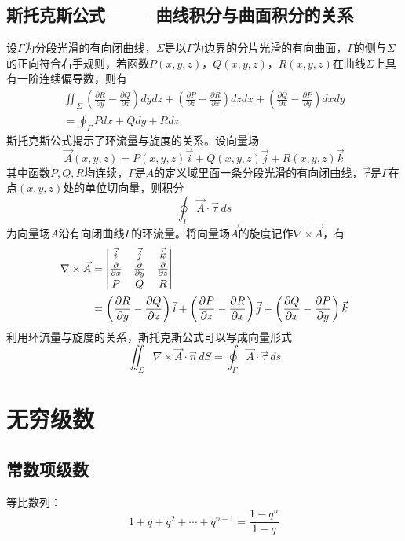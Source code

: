 \documentclass[a4paper,zihao=-4,UTF8]{ctexbook}
\begin{document}
\subsection{斯托克斯公式 —— 曲线积分与曲面积分的关系}
设$\Gamma$为分段光滑的有向闭曲线，$\Sigma$是以$\Gamma$为边界的分片光滑的有向曲面，$\Gamma$的侧与$\Sigma$的正向符合右手规则，若函数$P(x,y,z)$，$Q(x,y,z)$，$R(x,y,z)$在曲线$\Sigma$上具有一阶连续偏导数，则有
\begin{multline*}
\iint_\Sigma\left(\frac{\partial R}{\partial y}-\frac{\partial Q}{\partial z}\right)dydz+
\left(\frac{\partial P}{\partial z}-\frac{\partial R}{\partial x}\right)dzdx+
\left(\frac{\partial Q}{\partial x}-\frac{\partial P}{\partial y}\right)dxdy\\
=\oint_\Gamma Pdx+Qdy+Rdz
\end{multline*}
斯托克斯公式揭示了环流量与旋度的关系。设向量场
\[\vec{A}(x,y,z)=P(x,y,z)\vec{i}+Q(x,y,z)\vec{j}+R(x,y,z)\vec{k}\]
其中函数$P,Q,R$均连续，$\Gamma$是$A$的定义域里面一条分段光滑的有向闭曲线，$\vec{\tau}$是$\Gamma$在点$(x,y,z)$处的单位切向量，则积分
\[\oint_\Gamma \vec{A}\cdot\vec{\tau}\,ds\]
为向量场$A$沿有向闭曲线$\Gamma$的环流量。将向量场$\vec{A}$的旋度记作$\nabla\times \vec{A}$，有
\begin{align*}
\nabla\times\vec{A} &=
\left|
\begin{array}{@{}ccc@{}}
\vec{i}&\vec{j}&\vec{k}\\
\frac{\partial }{\partial x}&\frac{\partial }{\partial y}&\frac{\partial }{\partial z}\\[2pt]
    P&Q&R\\
\end{array}
\right|\\
 &=
\left(\frac{\partial R}{\partial y}-\frac{\partial Q}{\partial z}\right)\vec{i}+
\left(\frac{\partial P}{\partial z}-\frac{\partial R}{\partial x}\right)\vec{j}+
\left(\frac{\partial Q}{\partial x}-\frac{\partial P}{\partial y}\right)\vec{k}
\end{align*}
利用环流量与旋度的关系，斯托克斯公式可以写成向量形式
\[\iint_\Sigma\nabla\times\vec{A}\cdot\vec{n}\,dS=\oint_\Gamma\vec{A}\cdot\vec{\tau}\,ds\]
\section{无穷级数}
\subsection{常数项级数}
等比数列：
\[1+q+q^2+\cdots+q^{n-1}=\frac{1-q^{n}}{1-q}\]
\end{document}
